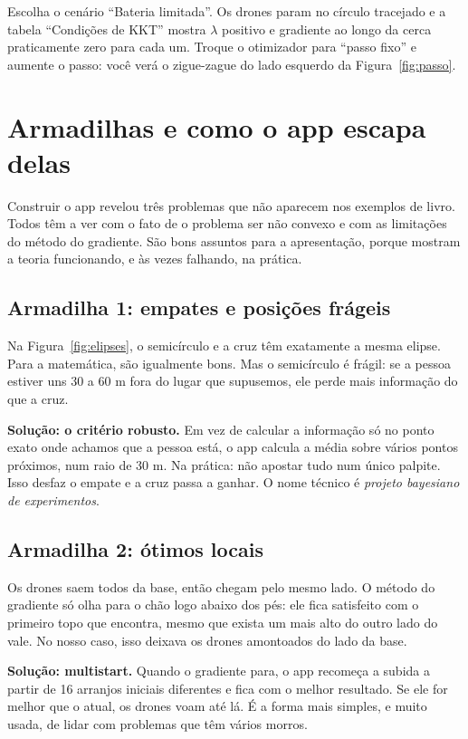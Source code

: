 \documentclass[11pt,a4paper]{article}
\begin{document}
\begin{noapp}
Escolha o cenário \enquote{Bateria limitada}. Os drones param no círculo tracejado e a tabela \enquote{Condições de KKT} mostra $\lambda$ positivo e gradiente ao longo da cerca praticamente zero para cada um. Troque o otimizador para \enquote{passo fixo} e aumente o passo: você verá o zigue-zague do lado esquerdo da Figura~\ref{fig:passo}.
\end{noapp}

\section{Armadilhas e como o app escapa delas}\label{sec:armadilhas}

Construir o app revelou três problemas que não aparecem nos exemplos de livro. Todos têm a ver com o fato de o problema ser não convexo e com as limitações do método do gradiente. São bons assuntos para a apresentação, porque mostram a teoria funcionando, e às vezes falhando, na prática.

\subsection{Armadilha 1: empates e posições frágeis}
Na Figura~\ref{fig:elipses}, o semicírculo e a cruz têm exatamente a mesma elipse. Para a matemática, são igualmente bons. Mas o semicírculo é frágil: se a pessoa estiver uns 30 a 60 m fora do lugar que supusemos, ele perde mais informação do que a cruz.

\textbf{Solução: o critério robusto.} Em vez de calcular a informação só no ponto exato onde achamos que a pessoa está, o app calcula a média sobre vários pontos próximos, num raio de 30 m. Na prática: não apostar tudo num único palpite. Isso desfaz o empate e a cruz passa a ganhar. O nome técnico é \emph{projeto bayesiano de experimentos}.

\subsection{Armadilha 2: ótimos locais}
Os drones saem todos da base, então chegam pelo mesmo lado. O método do gradiente só olha para o chão logo abaixo dos pés: ele fica satisfeito com o primeiro topo que encontra, mesmo que exista um mais alto do outro lado do vale. No nosso caso, isso deixava os drones amontoados do lado da base.

\textbf{Solução: multistart.} Quando o gradiente para, o app recomeça a subida a partir de 16 arranjos iniciais diferentes e fica com o melhor resultado. Se ele for melhor que o atual, os drones voam até lá. É a forma mais simples, e muito usada, de lidar com problemas que têm vários morros.
\end{document}
